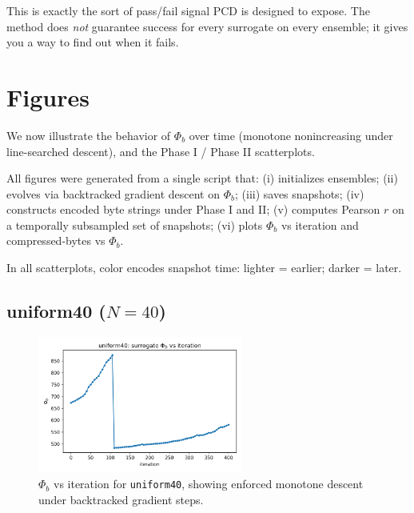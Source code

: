 \documentclass[11pt,a4paper]{article}
\numberwithin{equation}{section}
\newcommand{\phib}{\Phi_b}
\begin{document}
This is exactly the sort of pass/fail signal PCD is designed to expose. The method does \emph{not} guarantee success for every surrogate on every ensemble; it gives you a way to find out when it fails.

\section{Figures}
We now illustrate the behavior of $\phib$ over time (monotone nonincreasing under line-searched descent), and the Phase I / Phase II scatterplots.

All figures were generated from a single script that:
(i) initializes ensembles;
(ii) evolves via backtracked gradient descent on $\phib$;
(iii) saves snapshots;
(iv) constructs encoded byte strings under Phase I and II;
(v) computes Pearson $r$ on a temporally subsampled set of snapshots;
(vi) plots $\phib$ vs iteration and compressed-bytes vs $\phib$.

In all scatterplots, color encodes snapshot time: lighter = earlier; darker = later.

\subsection{uniform40 ($N{=}40$)}
\begin{figure}[h!]
\centering
\includegraphics[width=0.6\textwidth]{figures/uniform40_phib_vs_iter.png}
\caption{$\phib$ vs iteration for \texttt{uniform40}, showing enforced monotone descent under backtracked gradient steps.}
\label{fig:uniform40_iter}
\end{figure}
\end{document}
